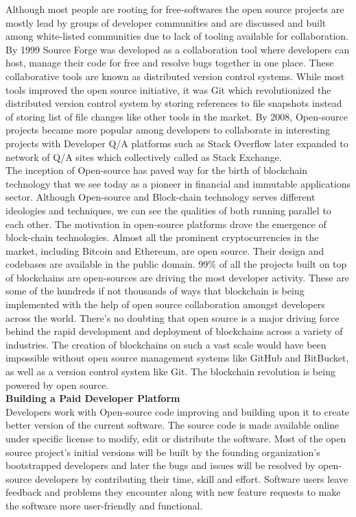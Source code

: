 \documentclass[10pt]{article}
\begin{document}
Although most people are rooting for free-softwares the open source projects are mostly lead by groups of developer communities and are discussed and built among white-listed communities due to lack of tooling available for collaboration. By 1999 Source Forge was developed as a collaboration tool where developers can host, manage their code for free and resolve bugs together in one place. These collaborative tools are known as distributed version control systems. While most tools improved the open source initiative, it was Git which revolutionized the distributed version control system by storing references to file snapshots instead of storing list of file changes like other tools in the market. By 2008, Open-source projects became more popular among developers to collaborate in interesting projects with Developer Q/A platforms such as Stack Overflow later expanded to network of Q/A sites which collectively called as Stack Exchange.\\

The inception of Open-source has paved way for the birth of blockchain technology that we see today as a pioneer in financial and immutable applications sector. Although Open-source and Block-chain technology serves different ideologies and techniques, we can see the qualities of both running parallel to each other. The motivation in open-source platforms drove the emergence of block-chain technologies. Almost all the prominent cryptocurrencies in the market, including Bitcoin and Ethereum, are open source. Their design and codebases are available in the public domain. 99\% of all the projects built on top of blockchains are open-sources are driving the most developer activity. These are some of the hundreds if not thousands of ways that blockchain is being implemented with the help of open source collaboration amongst developers across the world. There’s no doubting that open source is a major driving force behind the rapid development and deployment of blockchains across a variety of industries. The creation of blockchains on such a vast scale would have been impossible without open source management systems like GitHub and BitBucket, as well as a version control system like Git. The blockchain revolution is being powered by open source.\\

\textbf{Building a Paid Developer Platform}\\

Developers work with Open-source code improving and building upon it to create better version of the current software. The source code is made available online under specific license to modify, edit or distribute the software. Most of the open source project's initial versions will be built by the founding organization's bootstrapped developers and later the bugs and issues will be resolved by open-source developers by contributing their time, skill and effort. Software users leave feedback and problems they encounter along with new feature requests to make the software more user-friendly and functional.\\ 
\end{document}
